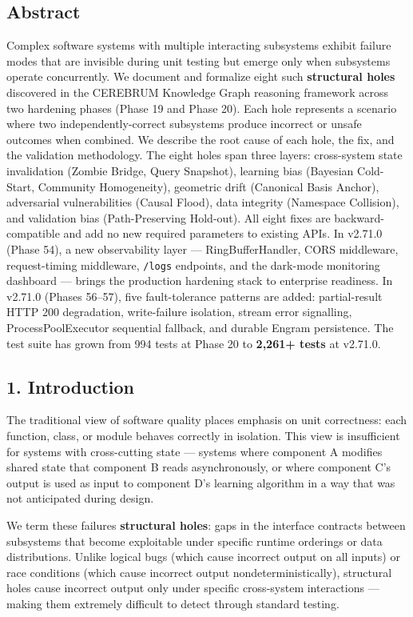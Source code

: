 
\subsection*{Abstract}
Complex software systems with multiple interacting subsystems exhibit failure modes that are invisible during unit testing but emerge only when subsystems operate concurrently. We document and formalize eight such \textbf{structural holes} discovered in the CEREBRUM Knowledge Graph reasoning framework across two hardening phases (Phase 19 and Phase 20). Each hole represents a scenario where two independently-correct subsystems produce incorrect or unsafe outcomes when combined. We describe the root cause of each hole, the fix, and the validation methodology. The eight holes span three layers: cross-system state invalidation (Zombie Bridge, Query Snapshot), learning bias (Bayesian Cold-Start, Community Homogeneity), geometric drift (Canonical Basis Anchor), adversarial vulnerabilities (Causal Flood), data integrity (Namespace Collision), and validation bias (Path-Preserving Hold-out). All eight fixes are backward-compatible and add no new required parameters to existing APIs. In v2.71.0 (Phase 54), a new observability layer --- RingBufferHandler, CORS middleware, request-timing middleware, \texttt{/logs} endpoints, and the dark-mode monitoring dashboard --- brings the production hardening stack to enterprise readiness. In v2.71.0 (Phases 56--57), five fault-tolerance patterns are added: partial-result HTTP 200 degradation, write-failure isolation, stream error signalling, ProcessPoolExecutor sequential fallback, and durable Engram persistence. The test suite has grown from 994 tests at Phase 20 to \textbf{2,261+ tests} at v2.71.0.

\subsection*{1. Introduction}
The traditional view of software quality places emphasis on unit correctness: each function, class, or module behaves correctly in isolation. This view is insufficient for systems with cross-cutting state --- systems where component A modifies shared state that component B reads asynchronously, or where component C's output is used as input to component D's learning algorithm in a way that was not anticipated during design.

We term these failures \textbf{structural holes}: gaps in the interface contracts between subsystems that become exploitable under specific runtime orderings or data distributions. Unlike logical bugs (which cause incorrect output on all inputs) or race conditions (which cause incorrect output nondeterministically), structural holes cause incorrect output only under specific cross-system interactions --- making them extremely difficult to detect through standard testing.

